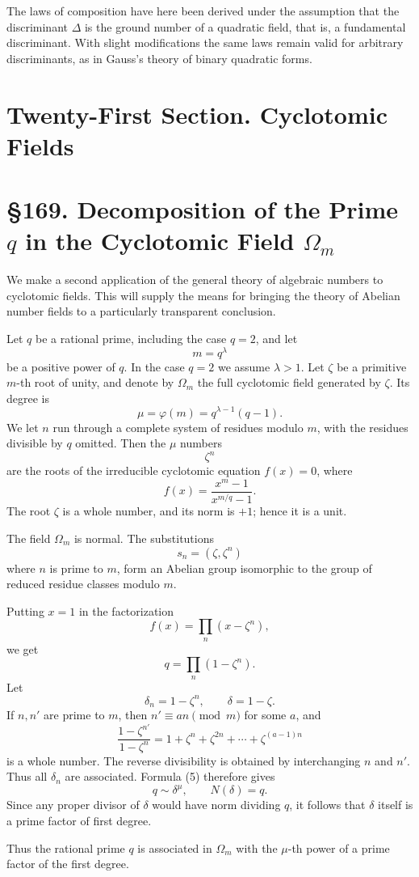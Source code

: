 \documentclass[12pt,a4paper]{article}
\newcommand{\webersection}[2]{\clearpage\section*{\S #1. #2}}
\newcommand{\booktitle}[1]{\clearpage\section*{#1}}
\begin{document}
The laws of composition have here been derived under the assumption that the discriminant \(\Delta\) is the ground number of a quadratic field, that is, a fundamental discriminant.  With slight modifications the same laws remain valid for arbitrary discriminants, as in Gauss's theory of binary quadratic forms.


\booktitle{Twenty-First Section. Cyclotomic Fields}

\webersection{169}{Decomposition of the Prime \(q\) in the Cyclotomic Field \(\Omega_m\)}

We make a second application of the general theory of algebraic numbers to cyclotomic fields.  This will supply the means for bringing the theory of Abelian number fields to a particularly transparent conclusion.

Let \(q\) be a rational prime, including the case \(q=2\), and let
\[
  m=q^\lambda
\tag{1}
\]
be a positive power of \(q\).  In the case \(q=2\) we assume \(\lambda>1\).  Let \(\zeta\) be a primitive \(m\)-th root of unity, and denote by \(\Omega_m\) the full cyclotomic field generated by \(\zeta\).  Its degree is
\[
  \mu=\varphi(m)=q^{\lambda-1}(q-1).
\tag{2}
\]
We let \(n\) run through a complete system of residues modulo \(m\), with the residues divisible by \(q\) omitted.  Then the \(\mu\) numbers
\[
  \zeta^n
\]
are the roots of the irreducible cyclotomic equation \(f(x)=0\), where
\[
  f(x)=\frac{x^m-1}{x^{m/q}-1}.
\tag{3}
\]
The root \(\zeta\) is a whole number, and its norm is \(+1\); hence it is a unit.

The field \(\Omega_m\) is normal.  The substitutions
\[
  s_n=(\zeta,\zeta^n)
\tag{4}
\]
where \(n\) is prime to \(m\), form an Abelian group isomorphic to the group of reduced residue classes modulo \(m\).

Putting \(x=1\) in the factorization
\[
  f(x)=\prod_n (x-\zeta^n),
\]
we get
\[
  q=\prod_n(1-\zeta^n).
\tag{5}
\]
Let
\[
  \delta_n=1-\zeta^n,\qquad \delta=1-\zeta.
\tag{6}
\]
If \(n,n'\) are prime to \(m\), then \(n'\equiv an\pmod m\) for some \(a\), and
\[
  \frac{1-\zeta^{n'}}{1-\zeta^n}
     =1+\zeta^n+\zeta^{2n}+\cdots+\zeta^{(a-1)n}
\]
is a whole number.  The reverse divisibility is obtained by interchanging \(n\) and \(n'\).  Thus all \(\delta_n\) are associated.  Formula (5) therefore gives
\[
  q\sim \delta^\mu,\qquad N(\delta)=q.
\tag{7}
\]
Since any proper divisor of \(\delta\) would have norm dividing \(q\), it follows that \(\delta\) itself is a prime factor of first degree.

Thus the rational prime \(q\) is associated in \(\Omega_m\) with the \(\mu\)-th power of a prime factor of the first degree.
\end{document}
